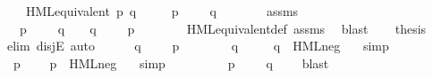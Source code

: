 \begin{isabellebody}
\ \ \ {\isacartoucheopen}{\isasymnot}\ HML{\isacharunderscore}{\kern0pt}equivalent\ p\ q{\isacartoucheclose}\isanewline
\ \ \ {\isacartoucheopen}{\isasymexists}\ {\isasymphi}{\isachardot}{\kern0pt}\ p\ {\isasymTurnstile}\ {\isasymphi}\ {\isasymand}\ {\isasymnot}\ q\ {\isasymTurnstile}\ {\isasymphi}{\isacartoucheclose}\isanewline
%
\isadelimproof
%
\endisadelimproof
%
\isatagproof
{}\isamarkupfalse%
\ {\isacharminus}{\kern0pt}\isanewline
\ \ \isamarkupfalse%
\ assms\ \isamarkupfalse%
\ {\isasymphi}\ \ {\isacartoucheopen}p\ {\isasymTurnstile}\ {\isasymphi}\ {\isasymand}\ {\isasymnot}\ q\ {\isasymTurnstile}\ {\isasymphi}\ {\isasymor}\ q\ {\isasymTurnstile}\ {\isasymphi}\ {\isasymand}\ {\isasymnot}\ p\ {\isasymTurnstile}\ {\isasymphi}{\isacartoucheclose}\isanewline
\ \ \ \ \isamarkupfalse%
\ HML{\isacharunderscore}{\kern0pt}equivalent{\isacharunderscore}{\kern0pt}def\ assms\ \isamarkupfalse%
\ blast\isanewline
\ \ \isamarkupfalse%
\ {\isacharquery}{\kern0pt}thesis\ \isamarkupfalse%
\ {\isacharparenleft}{\kern0pt}elim\ disjE{\isacharcomma}{\kern0pt}\ auto{\isacharparenright}{\kern0pt}\isanewline
\ \ \ \ \isamarkupfalse%
\ {\isacartoucheopen}q\ {\isasymTurnstile}\ {\isasymphi}{\isacartoucheclose}\ \ {\isacartoucheopen}{\isasymnot}\ p\ {\isasymTurnstile}\ {\isasymphi}{\isacartoucheclose}\isanewline
\ \ \ \ \isamarkupfalse%
\ {\isacartoucheopen}q\ {\isasymTurnstile}\ {\isasymphi}{\isacartoucheclose}\ \isamarkupfalse%
\ {\isacartoucheopen}{\isasymnot}\ q\ {\isasymTurnstile}\ HML{\isacharunderscore}{\kern0pt}neg\ {\isasymphi}{\isacartoucheclose}\ \isamarkupfalse%
\ simp\isanewline
\ \ \ \ \isamarkupfalse%
\ \isamarkupfalse%
\ {\isacartoucheopen}{\isasymnot}\ p\ {\isasymTurnstile}\ {\isasymphi}{\isacartoucheclose}\ \isamarkupfalse%
\ {\isacartoucheopen}p\ {\isasymTurnstile}\ HML{\isacharunderscore}{\kern0pt}neg\ {\isasymphi}{\isacartoucheclose}\ \isamarkupfalse%
\ simp\isanewline
\ \ \ \ \isamarkupfalse%
\ \isamarkupfalse%
\ {\isacartoucheopen}{\isasymexists}\ {\isasymphi}{\isachardot}{\kern0pt}\ p\ {\isasymTurnstile}\ {\isasymphi}\ {\isasymand}\ {\isasymnot}\ q\ {\isasymTurnstile}\ {\isasymphi}{\isacartoucheclose}\ \isamarkupfalse%
\ blast\isanewline
\ \ \isamarkupfalse%

\end{isabellebody}
